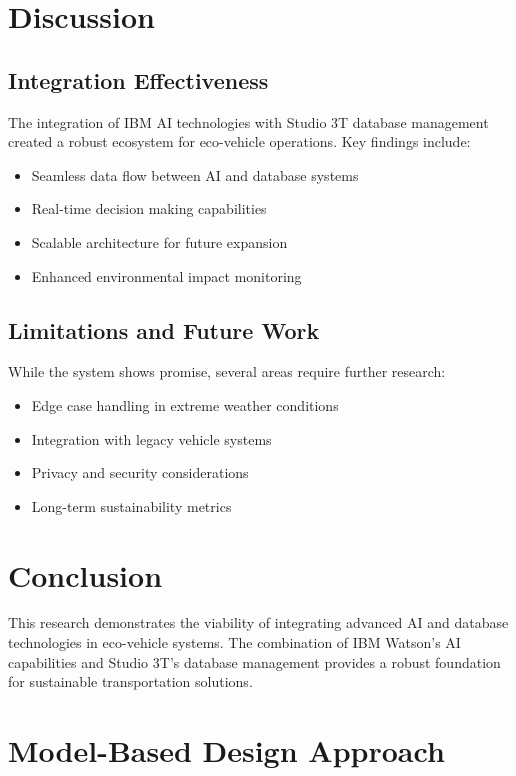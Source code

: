 \documentclass[12pt,a4paper]{article}
\begin{document}
\section{Discussion}
\subsection{Integration Effectiveness}
The integration of IBM AI technologies with Studio 3T database management created a robust ecosystem for eco-vehicle operations. Key findings include:
\begin{itemize}
    \item Seamless data flow between AI and database systems
    \item Real-time decision making capabilities
    \item Scalable architecture for future expansion
    \item Enhanced environmental impact monitoring
\end{itemize}

\subsection{Limitations and Future Work}
While the system shows promise, several areas require further research:
\begin{itemize}
    \item Edge case handling in extreme weather conditions
    \item Integration with legacy vehicle systems
    \item Privacy and security considerations
    \item Long-term sustainability metrics
\end{itemize}

\section{Conclusion}
This research demonstrates the viability of integrating advanced AI and database technologies in eco-vehicle systems. The combination of IBM Watson's AI capabilities and Studio 3T's database management provides a robust foundation for sustainable transportation solutions.

\section{Model-Based Design Approach}
\end{document}

